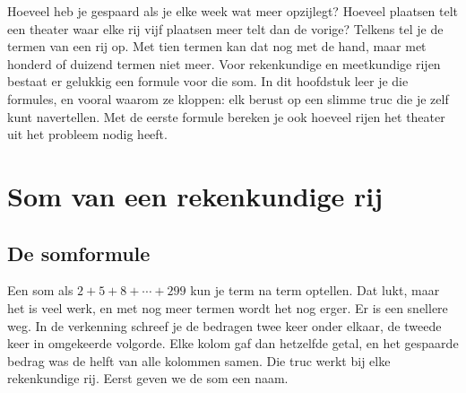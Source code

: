 Hoeveel heb je gespaard als je elke week wat meer opzijlegt? Hoeveel plaatsen telt een theater waar elke rij vijf plaatsen meer telt dan de vorige? Telkens tel je de termen van een rij op. Met tien termen kan dat nog met de hand, maar met honderd of duizend termen niet meer. Voor rekenkundige en meetkundige rijen bestaat er gelukkig een formule voor die som. In dit hoofdstuk leer je die formules, en vooral waarom ze kloppen: elk berust op een slimme truc die je zelf kunt navertellen. Met de eerste formule bereken je ook hoeveel rijen het theater uit het probleem nodig heeft.

\begin{oefeningen}[Start]

\end{oefeningen}


\section{Som van een rekenkundige rij}

\subsection{De somformule}

Een som als $2 + 5 + 8 + \cdots + 299$ kun je term na term optellen. Dat lukt, maar het is veel werk, en met nog meer termen wordt het nog erger. Er is een snellere weg. In de verkenning schreef je de bedragen twee keer onder elkaar, de tweede keer in omgekeerde volgorde. Elke kolom gaf dan hetzelfde getal, en het gespaarde bedrag was de helft van alle kolommen samen. Die truc werkt bij elke rekenkundige rij. Eerst geven we de som een naam.

